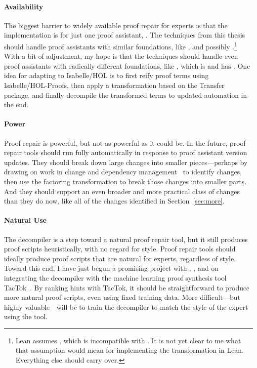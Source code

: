 \paragraph{Availability}
The biggest barrier to widely available proof repair for experts is that the implementation is for just one proof assistant, .
The techniques from this thesis should handle proof assistants with similar foundations, like ,
and possibly .\footnote{Lean assumes , which is incompatible with .
It is not yet clear to me what that assumption would mean for implementing the \toolnamec transformation in Lean.
Everything else should carry over.}
With a bit of adjustment, my hope is that the techniques should handle even proof assistants with radically different foundations,
like , which is  and has .
One idea for adapting \toolnamec to Isabelle/HOL is to first reify proof terms using Isabelle/HOL-Proofs,
then apply a transformation based on the Transfer~\cite{Huffman2013} package, and finally decompile the transformed terms to updated automation in the end.


\paragraph{Power}
Proof repair is powerful, but not as powerful as it could be.
In the future, proof repair tools should run fully automatically in response to proof assistant version updates.
They should break down large changes into smaller pieces---perhaps by drawing on work in change and 
dependency management~\cite{873647, Autexier:2010:CMH:1986659.1986663, Celik:2017:IRP:3155562.3155588} to identify changes, then use the factoring transformation
to break those changes into smaller parts.
And they should support an even broader and more practical class of changes than they do now, like all of the changes identified in Section~\ref{sec:more}.

\paragraph{Natural Use}
The decompiler is a step toward a natural proof repair tool, but it still produces proof scripts heuristically,
with no regard for style.
Proof repair tools should ideally produce proof scripts that are natural for experts, regardless of style.
Toward this end, I have just begun a promising project with , , and 
on integrating the decompiler with the machine learning proof synthesis tool TacTok~\cite{10.1145/3428299}.
By ranking hints with TacTok, it should be straightforward to produce more natural proof scripts, even using fixed training data.
More difficult---but highly valuable---will be to train the decompiler to match the style of the expert using the tool.

